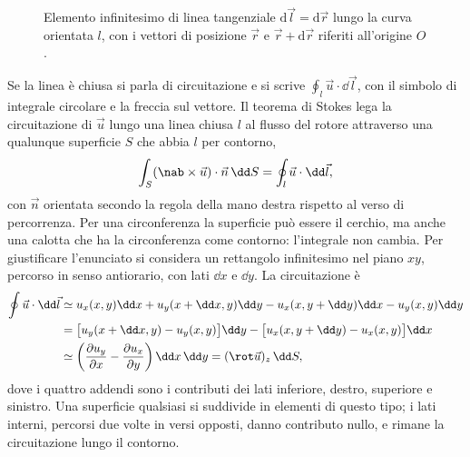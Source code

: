 \documentclass[main.tex]{subfiles}
\begin{document}
\begin{figure}[htbp]
	\caption{Elemento infinitesimo di linea tangenziale $\mathrm{d}\vec{l} = \mathrm{d}\vec{r}$ lungo la curva orientata $l$, con i vettori di posizione $\vec{r}$ e $\vec{r}+\mathrm{d}\vec{r}$ riferiti all'origine $O$.}
	\label{fig:pre:elemento_linea_curva}
\end{figure}




Se la linea è chiusa si parla di circuitazione e si scrive $\oint_l\vec u\cdot\dd\vec l$, con il simbolo di integrale circolare e la freccia sul vettore. Il teorema di Stokes lega la circuitazione di $\vec u$ lungo una linea chiusa $l$ al flusso del rotore attraverso una qualunque superficie $S$ che abbia $l$ per contorno,
\[
\int_S(\nab\times\vec u)\cdot\vec n\,\dd S=\oint_l\vec u\cdot\dd\vec l ,
\]
con $\vec n$ orientata secondo la regola della mano destra rispetto al verso di percorrenza. Per una circonferenza la superficie può essere il cerchio, ma anche una calotta che ha la circonferenza come contorno: l'integrale non cambia. Per giustificare l'enunciato si considera un rettangolo infinitesimo nel piano $xy$, percorso in senso antiorario, con lati $\dd x$ e $\dd y$. La circuitazione è
\begin{align*}
\oint\vec u\cdot\dd\vec l&\simeq u_x(x,y)\dd x+u_y(x+\dd x,y)\dd y-u_x(x,y+\dd y)\dd x-u_y(x,y)\dd y\\
&=\bigl[u_y(x+\dd x,y)-u_y(x,y)\bigr]\dd y-\bigl[u_x(x,y+\dd y)-u_x(x,y)\bigr]\dd x\\
&\simeq\left(\frac{\partial u_y}{\partial x}-\frac{\partial u_x}{\partial y}\right)\dd x\,\dd y=(\rot\vec u)_z\,\dd S ,
\end{align*}
dove i quattro addendi sono i contributi dei lati inferiore, destro, superiore e sinistro. Una superficie qualsiasi si suddivide in elementi di questo tipo; i lati interni, percorsi due volte in versi opposti, danno contributo nullo, e rimane la circuitazione lungo il contorno.
\end{document}
